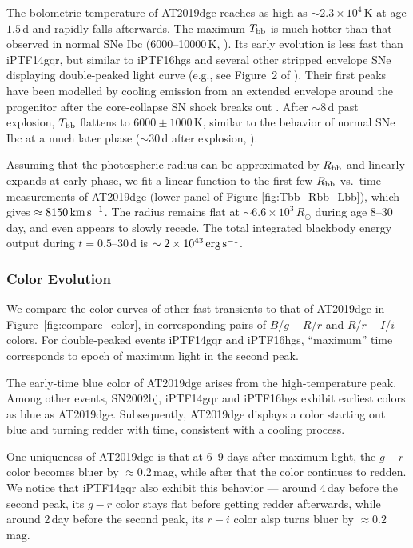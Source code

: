 \documentclass[twocolumn]{aastex63}
\begin{document}
\begin{CJK*}{UTF8}{gbsn}
The bolometric temperature of AT2019dge reaches as high as $\sim 2.3\times 10^4$\,K at age $1.5$\,d 
and rapidly falls afterwards. The maximum $T_{\rm bb}$ is much hotter than that observed in normal 
SNe Ibc (6000--10000\,K, \citealt{Taddia2018}). Its early evolution is less fast than iPTF14gqr, but 
similar to iPTF16hgs and several other stripped envelope SNe displaying double-peaked light curve 
(e.g., see Figure~2 of \citealt{Fremling2019}). Their first peaks have been modelled by cooling emission 
from an extended envelope around the progenitor after the core-collapse SN shock breaks out 
\citep{Modjaz2019}. After $\sim 8$\,d past explosion, $T_{\rm bb}$ flattens to $6000\pm1000$\,K, 
similar to the behavior of normal SNe Ibc at a much later phase ($\sim30$\,d after explosion, 
\citealt{Taddia2018}).

Assuming that the photospheric radius can be approximated by $R_{\rm bb}$ and linearly expands at 
early phase, we fit a linear function to the first few $R_{\rm bb}$ vs.~time measurements of AT2019dge 
(lower panel of Figure \ref{fig:Tbb_Rbb_Lbb}), which gives $\approx 8150\, {\rm km\,s^{-1}}$. The radius 
remains flat at $\sim 6.6\times 10^3\,R_\odot$ during age 8--30\,day, and even appears to slowly 
recede. The total integrated blackbody energy output during $ t = 0.5$--30\,d is $\sim 2\times 
10^{43}\,{\rm erg\,s^{-1}}$. 

\subsubsection{Color Evolution}
We compare the color curves of other fast transients to that of AT2019dge in 
Figure~\ref{fig:compare_color}, in corresponding pairs of $B$/$g-R$/$r$ and $R$/$r-I$/$i$ colors. For 
double-peaked events iPTF14gqr and iPTF16hgs, ``maximum'' time corresponds to epoch of maximum 
light in the second peak.

The early-time blue color of AT2019dge arises from the high-temperature peak. Among other events, 
SN2002bj, iPTF14gqr and iPTF16hgs exhibit earliest colors as blue as AT2019dge. Subsequently, 
AT2019dge displays a color starting out blue and turning redder with time, consistent with a cooling 
process. 

One uniqueness of AT2019dge is that at 6--9 days after maximum light, the $g-r$ color becomes bluer 
by $\approx 0.2$\,mag, while after that the color continues to redden. We notice that iPTF14gqr also 
exhibit this behavior --- around 4\,day before the second peak, its $g-r$ color stays flat before getting 
redder afterwards, while around 2\,day before the second peak, its $r-i$ color alsp turns bluer by 
$\approx 0.2$\,mag.


\end{CJK*}
\end{document}
